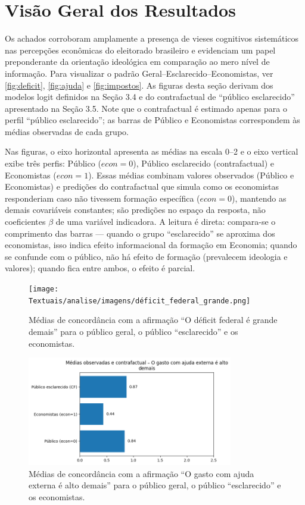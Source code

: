\chapter{Visão Geral dos Resultados}
Os achados corroboram amplamente a presença de vieses cognitivos sistemáticos nas percepções econômicas do eleitorado brasileiro e evidenciam um papel preponderante da orientação ideológica em comparação ao mero nível de informação. Para visualizar o padrão Geral–Esclarecido–Economistas, ver \autoref{fig:deficit}, \autoref{fig:ajuda} e \autoref{fig:impostos}. As figuras desta seção derivam dos modelos logit definidos na Seção 3.4 e do contrafactual de “público esclarecido” apresentado na Seção 3.5. Note que o contrafactual é estimado apenas para o perfil “público esclarecido”; as barras de Público e Economistas correspondem às médias observadas de cada grupo.

Nas figuras, o eixo horizontal apresenta as médias na escala 0–2 e o eixo vertical exibe três perfis: Público ($\textit{econ}=0$), Público esclarecido (contrafactual) e Economistas ($\textit{econ}=1$). Essas médias combinam valores observados (Público e Economistas) e predições do contrafactual que simula como os economistas responderiam caso não tivessem formação específica ($\textit{econ}=0$), mantendo as demais covariáveis constantes; são predições no espaço da resposta, não coeficientes $\beta$ de uma variável indicadora. A leitura é direta: compara-se o comprimento das barras — quando o grupo “esclarecido” se aproxima dos economistas, isso indica efeito informacional da formação em Economia; quando se confunde com o público, não há efeito de formação (prevalecem ideologia e valores); quando fica entre ambos, o efeito é parcial.


\begin{figure}[htbp]
\centering
\texttt{[image: Textuais/analise/imagens/déficit\_federal\_grande.png]}
\caption{Médias de concordância com a afirmação ``O déficit federal é grande demais'' para o público geral, o público ``esclarecido'' e os economistas.}
\label{fig:deficit}
\end{figure}

\begin{figure}[htbp]
\centering
\includegraphics[width=0.8\textwidth]{Textuais/analise/imagens/gasto_ajuda_externa.png}
\caption{Médias de concordância com a afirmação ``O gasto com ajuda externa é alto demais'' para o público geral, o público ``esclarecido'' e os economistas.}
\label{fig:ajuda}
\end{figure}

